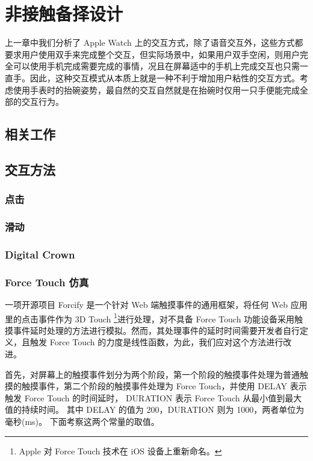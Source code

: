 \chapter{非接触备择设计}

上一章中我们分析了 Apple Watch 上的交互方式，除了语音交互外，这些方式都要求用户使用双手来完成整个交互，但实际场景中，如果用户双手空闲，则用户完全可以使用手机完成需要完成的事情，况且在屏幕适中的手机上完成交互也只需一直手。因此，这种交互模式从本质上就是一种不利于增加用户粘性的交互方式。考虑使用手表时的抬碗姿势，最自然的交互自然就是在抬碗时仅用一只手便能完成全部的交互行为。

\section{相关工作}


\section{交互方法}

\subsection{点击}

\subsection{滑动}

\subsection{Digital Crown}

\subsection{Force Touch 仿真}

一项开源项目 Forcify \cite{Huxpro:2016ua} 是一个针对 Web 端触摸事件的通用框架，将任何 Web 应用里的点击事件作为 3D Touch \footnote{Apple 对 Force Touch 技术在 iOS 设备上重新命名。}进行处理，对不具备 Force Touch 功能设备采用触摸事件延时处理的方法进行模拟。然而，其处理事件的延时时间需要开发者自行定义，且触发 Force Touch 的力度是线性函数，为此，我们应对这个方法进行改进。

首先，对屏幕上的触摸事件划分为两个阶段，第一个阶段的触摸事件处理为普通触摸的触摸事件，第二个阶段的触摸事件处理为 Force Touch，并使用 DELAY 表示触发 Force Touch 的时间延时，
DURATION 表示 Force Touch 从最小值到最大值的持续时间。
其中 DELAY 的值为 200，DURATION 则为 1000，两者单位为毫秒(ms)。
下面考察这两个常量的取值。

